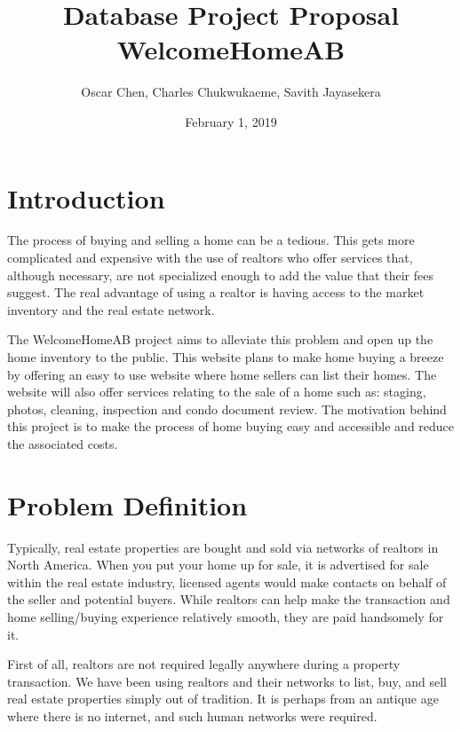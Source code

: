 \documentclass[letterpaper,12pt]{article}
\begin{document}
\title{\Large{\textbf{Database Project Proposal \\ WelcomeHomeAB}}}
\author{Oscar Chen, Charles Chukwukaeme, Savith Jayasekera}
\date{February 1, 2019}
\setlength{\droptitle}{-2.5cm}
\maketitle


\section{Introduction}

The process of buying and selling a home can be a tedious. This gets more complicated and expensive with the use of realtors who offer services that, although necessary, are not specialized enough to add the value that their fees suggest. The real advantage of using a realtor is having access to the market inventory and the real estate network.

The WelcomeHomeAB project aims to alleviate this problem and open up the home inventory to the public. This website plans to make home buying a breeze by offering an easy to use website where home sellers can list their homes. The website will also offer services relating to the sale of a home such as: staging, photos, cleaning, inspection and condo document review.
The motivation behind this project is to make the process of home buying easy and accessible and reduce the associated costs.


\section{Problem Definition}

Typically, real estate properties are bought and sold via networks of realtors in North America. When you put your home up for sale, it is advertised for sale within the real estate industry, licensed agents would make contacts on behalf of the seller and potential buyers. While realtors can help make the transaction and home selling/buying experience relatively smooth, they are paid handsomely for it. 


First of all, realtors are not required legally anywhere during a property transaction. We have been using realtors and their networks to list, buy, and sell real estate properties simply out of tradition. It is perhaps from an antique age where there is no internet, and such human networks were required.
\end{document}
